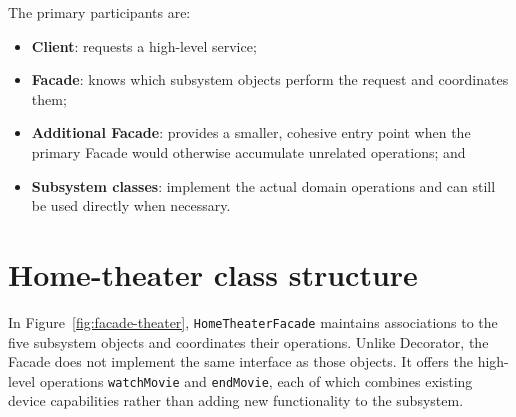 \documentclass[11pt,a4paper]{report}
\begin{document}
The primary participants are:
\begin{itemize}
  \item \textbf{Client}: requests a high-level service;
  \item \textbf{Facade}: knows which subsystem objects perform the request and
  coordinates them;
  \item \textbf{Additional Facade}: provides a smaller, cohesive entry point
  when the primary Facade would otherwise accumulate unrelated operations; and
  \item \textbf{Subsystem classes}: implement the actual domain operations and
  can still be used directly when necessary.
\end{itemize}

\section{Home-theater class structure}
In Figure~\ref{fig:facade-theater}, \texttt{HomeTheaterFacade} maintains
associations to the five subsystem objects and coordinates their operations.
Unlike Decorator, the Facade does not implement the same interface as those
objects. It offers the high-level operations \texttt{watchMovie} and
\texttt{endMovie}, each of which combines existing device capabilities rather
than adding new functionality to the subsystem.
\end{document}
